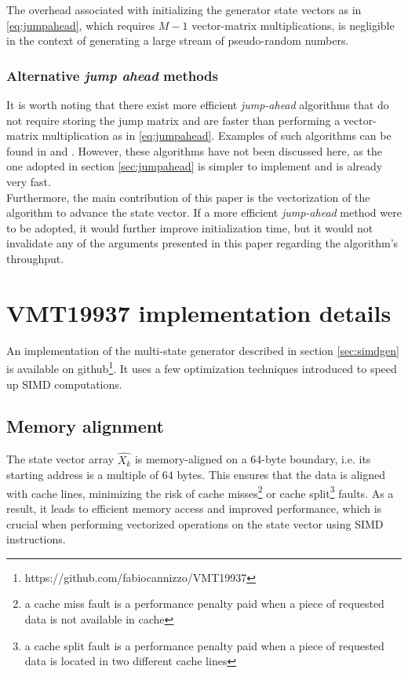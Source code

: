 \documentclass[preprint,1p,times]{elsarticle}
\begin{document}
\noindent The overhead associated with initializing the generator state vectors as in \eqref{eq:jumpahead}, which requires $M-1$ vector-matrix multiplications, is negligible in the context of generating a large stream of pseudo-random numbers.

\subsubsection{Alternative \textit{jump ahead} methods}
\noindent It is worth noting that there exist more efficient \textit{jump-ahead} algorithms that do not require storing the jump matrix and are faster than performing a vector-matrix multiplication as in \eqref{eq:jumpahead}. Examples of such algorithms can be found in \cite{jump1} and \cite{jump2}. However, these algorithms have not been discussed here, as the one adopted in section \ref{sec:jumpahead} is simpler to implement and is already very fast.\\

\noindent Furthermore, the main contribution of this paper is the vectorization of the algorithm to advance the state vector. If a more efficient \textit{jump-ahead} method were to be adopted, it would further improve initialization time, but it would not invalidate any of the arguments presented in this paper regarding the algorithm's throughput.

\section{VMT19937 implementation details}
\noindent An implementation of the multi-state generator described in section \ref{sec:simdgen} is available on github\footnote{\label{fn:github} https://github.com/fabiocannizzo/VMT19937}. It uses a few optimization techniques introduced to speed up SIMD computations.

\subsection{Memory alignment}
\noindent The state vector array $\hat{X_k}$ is memory-aligned on a 64-byte boundary, i.e. its starting address is a multiple of 64 bytes. This ensures that the data is aligned with cache lines, minimizing the risk of cache misses\footnote{a cache miss fault is a performance penalty paid when a piece of requested data is not available in cache} or cache split\footnote{a cache split fault is a performance penalty paid when a piece of requested data is located in two different cache lines} faults. As a result, it leads to efficient memory access and improved performance, which is  crucial when performing vectorized operations on the state vector using SIMD instructions.
\end{document}
